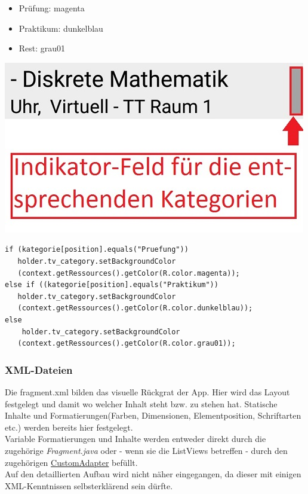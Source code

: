 \begin{description}
\begin{itemize}
\item Prüfung: \textcolor{magentat}{magenta}
\item Praktikum: \textcolor{dunkelblaut}{dunkelblau}
\item Rest: \textcolor{grau01t}{grau01}
\end{itemize}
\includegraphics[scale=0.5]{05_Handbuch/img/kategorie.jpg}
\begin{lstlisting}
if (kategorie[position].equals("Pruefung"))
   holder.tv_category.setBackgroundColor
   (context.getRessources().getColor(R.color.magenta));
else if ((kategorie[position].equals("Praktikum"))
   holder.tv_category.setBackgroundColor
   (context.getRessources().getColor(R.color.dunkelblau));
else
    holder.tv_category.setBackgroundColor
   (context.getRessources().getColor(R.color.grau01));

\end{lstlisting}
\newpage
\subsubsection{XML-Dateien}
\label{XML}
Die fragment.xml bilden das visuelle Rückgrat der App. Hier wird das Layout festgelegt und damit wo welcher Inhalt steht bzw. zu stehen hat. Statische Inhalte und Formatierungen(Farben, Dimensionen, Elementposition, Schriftarten etc.) werden bereits hier festgelegt.\\
Variable Formatierungen und Inhalte werden entweder direkt durch die zugehörige \textit{Fragment.java} oder - wenn sie die ListViews betreffen - durch den zugehörigen \hyperref[CustomAdapter]{CustomAdapter} befüllt.\\
Auf den detaillierten Aufbau wird nicht näher eingegangen, da dieser mit einigen XML-Kenntnissen selbsterklärend sein dürfte.


\end{description}
